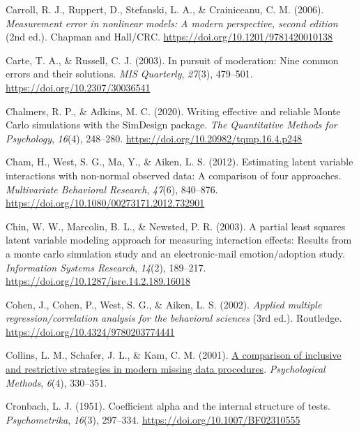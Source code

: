 \documentclass[
  man]{apa6}
\newlength{\cslhangindent}
\newenvironment{CSLReferences}[2] %
 {\begin{list}{}{%
  \setlength{\itemindent}{0pt}
  \setlength{\leftmargin}{0pt}
  \setlength{\parsep}{0pt}
  \ifodd #1
   \setlength{\leftmargin}{\cslhangindent}
   \setlength{\itemindent}{-1\cslhangindent}
  \fi
  \setlength{\itemsep}{#2\baselineskip}}}
 {\end{list}}
\begin{document}
\begin{CSLReferences}{1}{0}
Carroll, R. J., Ruppert, D., Stefanski, L. A., \& Crainiceanu, C. M. (2006). \emph{Measurement error in nonlinear models: {A} modern perspective, second edition} (2nd ed.). {Chapman and Hall/CRC}. \url{https://doi.org/10.1201/9781420010138}

Carte, T. A., \& Russell, C. J. (2003). In pursuit of moderation: {Nine} common errors and their solutions. \emph{MIS Quarterly}, \emph{27}(3), 479--501. \url{https://doi.org/10.2307/30036541}

Chalmers, R. P., \& Adkins, M. C. (2020). Writing effective and reliable {Monte Carlo} simulations with the {SimDesign} package. \emph{The Quantitative Methods for Psychology}, \emph{16}(4), 248--280. \url{https://doi.org/10.20982/tqmp.16.4.p248}

Cham, H., West, S. G., Ma, Y., \& Aiken, L. S. (2012). Estimating latent variable interactions with non-normal observed data: A comparison of four approaches. \emph{Multivariate Behavioral Research}, \emph{47}(6), 840--876. \url{https://doi.org/10.1080/00273171.2012.732901}

Chin, W. W., Marcolin, B. L., \& Newsted, P. R. (2003). A partial least squares latent variable modeling approach for measuring interaction effects: Results from a monte carlo simulation study and an electronic-mail emotion/adoption study. \emph{Information Systems Research}, \emph{14}(2), 189--217. \url{https://doi.org/10.1287/isre.14.2.189.16018}

Cohen, J., Cohen, P., West, S. G., \& Aiken, L. S. (2002). \emph{Applied multiple regression/correlation analysis for the behavioral sciences} (3rd ed.). Routledge. \url{https://doi.org/10.4324/9780203774441}

Collins, L. M., Schafer, J. L., \& Kam, C. M. (2001). \href{}{A comparison of inclusive and restrictive strategies in modern missing data procedures}. \emph{Psychological Methods}, \emph{6}(4), 330--351.

Cronbach, L. J. (1951). Coefficient alpha and the internal structure of tests. \emph{Psychometrika}, \emph{16}(3), 297--334. \url{https://doi.org/10.1007/BF02310555}


\end{CSLReferences}
\end{document}
